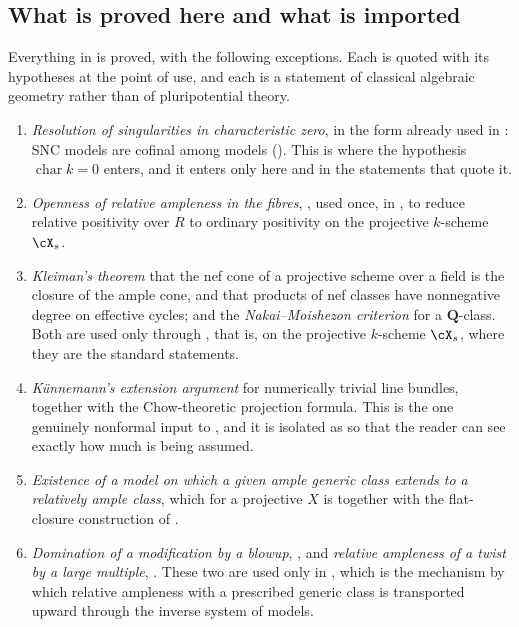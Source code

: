 \subsection{What is proved here and what is imported}
\label{sec:ch20-imported}

Everything in  is
proved, with the following exceptions.  Each is quoted with its hypotheses
at the point of use, and each is a statement of classical algebraic
geometry rather than of pluripotential theory.

\begin{enumerate}
\item\label{itm:ch20-import:res}
 \emph{Resolution of singularities in characteristic zero}, in the form
 already used in : SNC models are cofinal among models
 ().  This is where the hypothesis
 \(\operatorname{char}k=0\) enters, and it enters only here and in the
 statements that quote it.
\item\label{itm:ch20-import:ega}
 \emph{Openness of relative ampleness in the fibres},
 \cite[4.7.1]{EGAIII1}, used once, in
 , to reduce relative positivity over
 \(R\) to ordinary positivity on the projective \(k\)-scheme \(\cX_s\).
\item\label{itm:ch20-import:kleiman}
 \emph{Kleiman's theorem} that the nef cone of a projective scheme over a
 field is the closure of the ample cone, and that products of nef classes
 have nonnegative degree on effective cycles; and the
 \emph{Nakai--Moishezon criterion} for a \(\mathbf Q\)-class.  Both are used
 only through , that is, on the projective
 \(k\)-scheme \(\cX_s\), where they are the standard statements.
\item\label{itm:ch20-import:kunnemann}
 \emph{K\"unnemann's extension argument} for numerically trivial line
 bundles, together with the Chow-theoretic projection formula.  This is the
 one genuinely nonformal input to , and it is
 isolated as  so that the reader can see
 exactly how much is being assumed.
\item\label{itm:ch20-import:extension}
 \emph{Existence of a model on which a given ample generic class extends to
 a relatively ample class}, which for a projective \(X\) is
  together with the flat-closure
 construction of .
\item\label{itm:ch20-import:blowup}
 \emph{Domination of a modification by a blowup},
 , and \emph{relative ampleness of a
 twist by a large multiple}, \cite[4.6.13]{EGAII}.  These two are used only
 in , which is the mechanism by which
 relative ampleness with a prescribed generic class is transported upward
 through the inverse system of models.
\end{enumerate}

